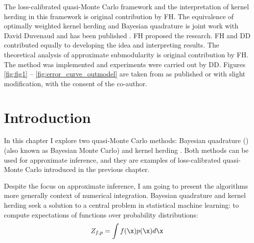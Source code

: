 
\begin{summarycontributions}
The loss-calibrated quasi-Monte Carlo framework and the interpretation of kernel herding in this framework is original contribution by FH. The equivalence of optimally weighted kernel herding and Bayesian quadrature is joint work with David Duvenaud and has been published \citep{Huszar2012herding}. FH proposed the research. FH and DD contributed equally to developing the idea and interpreting results. The theoretical analysis of approximate submodularity is original contribution by FH. The method was implemented and experiments were carried out by DD. Figures \ref{fig:fig1} -- \ref{fig:error_curve_outmodel} are taken from \citep{Huszar2012herding} as published or with slight modification, with the consent of the co-author.
\end{summarycontributions}


\section{Introduction}

In this chapter I explore two quasi-Monte Carlo methods: Bayesian quadrature (\bq{}) \citep{BZHermiteQuadrature,BZMonteCarlo} (also known as Bayesian Monte Carlo) and kernel herding \citep{Chen2010}. Both methods can be used for approximate inference, and they are examples of loss-calibrated quasi-Monte Carlo introduced in the previous chapter.

Despite the focus on approximate inference, I am going to present the algorithms more generally context of numerical integration. Bayesian quadrature and kernel herding seek a solution to a central problem in statistical machine learning: to compute expectations of functions over probability distributions:
\begin{equation}
	Z_{f,p} = \int f(\x) p(\x) d\x \label{eqn:integral}
\end{equation}

